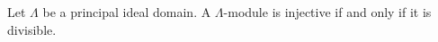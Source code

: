 Let $\Lambda$ be a principal ideal domain. A $\Lambda$-module is injective if and only if it is divisible.
